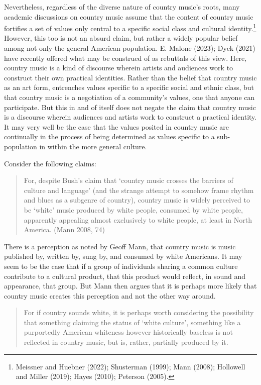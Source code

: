 \documentclass[12pt]{book}
\theoremstyle{definition}
\theoremstyle{remark}
\begin{document}
Nevertheless, regardless of the diverse nature of country music's roots, many academic discussions on country music assume that the content of country music fortifies a set of values only central to a specific social class and cultural identity.\footnote{Meissner and Huebner (2022); Shusterman (1999); Mann (2008); Hollowell and Miller (2019); Hayes (2010); Peterson (2005).} However, this too is not an absurd claim, but rather a widely popular belief among not only the general American population. E. Malone (2023); Dyck (2021) have recently offered what may be construed of as rebuttals of this view. Here, country music is a kind of discourse wherein artists and audiences work to construct their own practical identities. Rather than the belief that country music as an art form, entrenches values specific to a specific social and ethnic class, but that country music is a negotiation of a community's values, one that anyone can participate. But this in and of itself does not negate the claim that country music is a discourse wherein audiences and artists work to construct a practical identity. It may very well be the case that the values posited in country music are continually in the process of being determined as values specific to a sub-population in within the more general culture.

Consider the following claims:

\begin{quote}
For, despite Bush's claim that `country music crosses the barriers of culture and language' (and the strange attempt to somehow frame rhythm and blues as a subgenre of country), country music is widely perceived to be `white' music produced by white people, consumed by white people, apparently appealing almost exclusively to white people, at least in North America. (Mann 2008, 74)
\end{quote}

There is a perception as noted by Geoff Mann, that country music is music published by, written by, sung by, and consumed by white Americans. It may seem to be the case that if a group of individuals sharing a common culture contribute to a cultural product, that this product would reflect, in sound and appearance, that group. But Mann then argues that it is perhaps more likely that country music creates this perception and not the other way around.

\begin{quote}
For if country sounds white, it is perhaps worth considering the possibility that something claiming the status of `white culture', something like a purportedly American whiteness however historically baseless is not reflected in country music, but is, rather, partially produced by it.
\end{quote}
\end{document}
